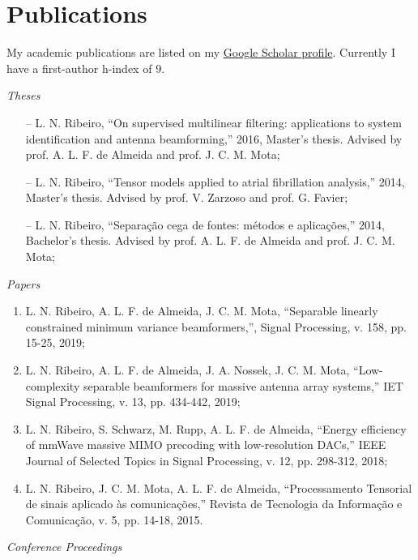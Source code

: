 \section{Publications}

My academic publications are listed on my \href{https://scholar.google.com.br/citations?user=STk6opQAAAAJ}{Google Scholar profile}. Currently I have a first-author h-index of $9$.

{\sl Theses}

\begin{itemize}
	\item[--] L. N. Ribeiro, ``On supervised multilinear filtering: applications to system identification and antenna beamforming,'' 2016, Master's thesis. Advised by prof. A. L. F. de Almeida and prof. J. C. M. Mota;
	\item[--] L. N. Ribeiro, ``Tensor models applied to atrial fibrillation analysis,'' 2014, Master's thesis. Advised by prof. V. Zarzoso and prof. G. Favier;
	\item[--] L. N. Ribeiro, ``Separação cega de fontes: métodos e aplicações,'' 2014, Bachelor's thesis. Advised by prof. A. L. F. de Almeida and prof. J. C. M. Mota;
\end{itemize}

{\sl Papers}

\begin{enumerate}
	\item L. N. Ribeiro, A. L. F. de Almeida, J. C. M. Mota, ``Separable linearly constrained minimum variance beamformers,'', Signal Processing, v. 158, pp. 15-25, 2019;
	
	\item L. N. Ribeiro, A. L. F. de Almeida, J. A. Nossek, J. C. M. Mota, ``Low-complexity separable beamformers for massive antenna array systems,'' IET Signal Processing, v. 13, pp. 434-442, 2019;
	
	\item L. N. Ribeiro, S. Schwarz, M. Rupp, A. L. F. de Almeida, ``Energy efficiency of mmWave massive MIMO precoding with low-resolution DACs,'' IEEE Journal of Selected Topics in Signal Processing, v. 12, pp. 298-312, 2018;
	
	\item L. N. Ribeiro, J. C. M. Mota, A. L. F. de Almeida, ``Processamento Tensorial de sinais aplicado às comunicações,'' Revista de Tecnologia da Informação e Comunicação, v. 5, pp. 14-18, 2015.
\end{enumerate}

{\sl Conference Proceedings}

